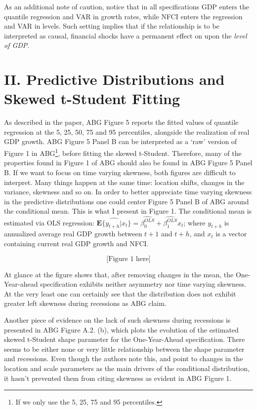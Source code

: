 \documentclass[11pt,]{article}
\let\rmarkdownfootnote\footnote%
\def\footnote{\protect\rmarkdownfootnote}
\begin{document}
As an additional note of caution, notice that in all specifications GDP
enters the quantile regression and VAR in growth rates, while NFCI
enters the regression and VAR in levels. Such setting implies that if
the relationship is to be interpreted as causal, financial shocks have a
permanent effect on upon the \textit{level of GDP}.

\hypertarget{ii.-predictive-distributions-and-skewed-t-student-fitting}{%
\section{II. Predictive Distributions and Skewed t-Student
Fitting}\label{ii.-predictive-distributions-and-skewed-t-student-fitting}}

As described in the paper, ABG Figure 5 reports the fitted values of
quantile regression at the 5, 25, 50, 75 and 95 percentiles, alongside
the realization of real GDP growth. ABG Figure 5 Panel B can be
interpreted as a `raw' version of Figure 1 in
ABG\footnote{If we only use the 5, 25, 75 and 95 percentiles.}, before
fitting the skewed t-Student. Therefore, many of the properties found in
Figure 1 of ABG should also be found in ABG Figure 5 Panel B. If we want
to focus on time varying skewness, both figures are difficult to
interpret. Many things happen at the same time: location shifts, changes
in the variance, skewness and so on. In order to better appreciate time
varying skewness in the predictive distributions one could center Figure
5 Panel B of ABG around the conditional mean. This is what I present in
Figure 1. The conditional mean is estimated via OLS regression:
\(\widehat{\mathbf{E}\{y_{t+h} | x_t \}} = \widehat{\beta_0^{OLS}} + \widehat{\beta_1^{OLS}}x_t\);
where \(y_{t+h}\) is annualized average real GDP growth between \(t+1\)
and \(t+h\), and \(x_t\) is a vector containing current real GDP growth
and NFCI.

\[
\text{[Figure 1 here]}
\]

At glance at the figure shows that, after removing changes in the mean,
the One-Year-ahead specification exhibits neither asymmetry nor time
varying skewness. At the very least one can certainly see that the
distribution does not exhibit greater left skewness during recessions as
ABG claim.

Another piece of evidence on the lack of such skewness during recessions
is presented in ABG Figure A.2. (b), which plots the evolution of the
estimated skewed t-Student shape parameter for the One-Year-Ahead
specification. There seems to be either none or very little relationship
between the shape parameter and recessions. Even though the authors note
this, and point to changes in the location and scale parameters as the
main drivers of the conditional distribution, it hasn't prevented them
from citing skewness as evident in ABG Figure 1.
\end{document}
